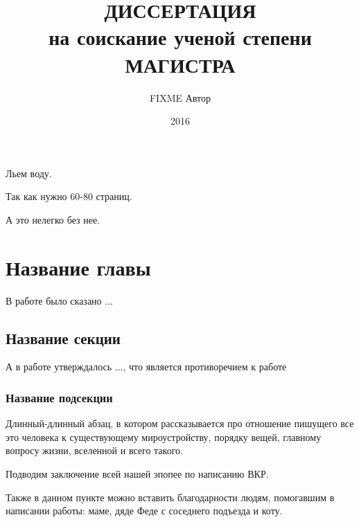 \documentclass[14pt, bachelor, substylefile = miee_master.rtx]{disser}
\begin{document}
\title{ДИССЕРТАЦИЯ\\[-14pt]на соискание ученой степени\\МАГИСТРА}

\author{FIXME Автор}

\date{2016}

\maketitle

\tableofcontents

\intro

Льем воду.

Так как нужно 60-80 страниц.

А это нелегко без нее.

\chapter{Название главы}

В работе \cite{ARIMA} было сказано ...

\section{Название секции}

А в работе \cite{Allen} утверждалось ..., что является противоречием к работе \cite{ARIMA}

\subsection{Название подсекции}

Длинный-длинный абзац, в котором рассказывается про отношение пишущего все это человека к существующему мироустройству, порядку вещей, главному вопросу жизни, вселенной и всего такого.




\conclusion

Подводим заключение всей нашей эпопее по написанию ВКР.

Также в данном пункте можно вставить благодарности людям, помогавшим в написании работы: маме, дяде Феде с соседнего подъезда и коту.



\end{document}
